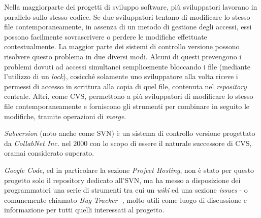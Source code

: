 Nella maggiorparte dei progetti di sviluppo software, più sviluppatori lavorano in parallelo sullo stesso codice. Se due sviluppatori tentano di modificare lo stesso file contemporaneamente, in assenza di un metodo di gestione degli accessi, essi possono facilmente sovrascrivere o perdere le modifiche effettuate contestualmente.
La maggior parte dei sistemi di controllo versione possono risolvere questo problema in due diversi modi. Alcuni di questi prevengono i problemi dovuti ad accessi simultanei semplicemente bloccando i file (mediante l'utilizzo di un \textit{lock}), cosicché solamente uno sviluppatore alla volta riceve i permessi di accesso in scrittura alla copia di quel file, contenuta nel \textit{repository} centrale. Altri, come CVS, permettono a più sviluppatori di modificare lo stesso file contemporaneamente e forniscono gli strumenti per combinare in seguito le modifiche, tramite operazioni di \emph{merge}.

\emph{Subversion} (noto anche come SVN) è un sistema di controllo versione progettato da \textit{CollabNet Inc.} nel $2000$ con lo scopo di essere il naturale successore di CVS, oramai considerato superato.

\textit{Google Code}, ed in particolare la sezione \textit{Project Hosting}, non è stato per questo progetto solo il repository dedicato all'SVN, ma ha messo a disposizione dei programmatori una serie di strumenti tra cui un \textit{wiki} ed una sezione \textit{issues} - o comunemente chiamato \emph{Bug Tracker} -, molto utili come luogo di discussione e informazione per tutti quelli interessati al progetto.

